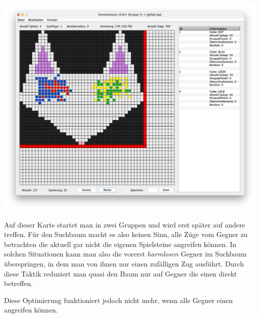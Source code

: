 \vspace{1em}
\begin{minipage}{\linewidth}
    \centering
    \includegraphics[width=0.8\linewidth]{pics/gitlab}
    \label{fig:gitlab}
\end{minipage}
\vspace{1em}

Auf dieser Karte startet man in zwei Gruppen und wird erst sp\"ater auf andere treffen.
F\"ur den Suchbaum macht es also keinen Sinn, alle Z\"uge vom Gegner zu betrachten die aktuell gar nicht die eigenen Spielsteine angreifen k\"onnen.
In solchen Situationen kann man also die vorerst \textit{harmlosen} Gegner im Suchbaum \"uberspringen, in dem man von ihnen nur einen zuf\"alligen Zug ausf\"uhrt.
Durch diese Taktik reduziert man quasi den Baum nur auf Gegner die einen direkt betreffen.

Diese Optimierung funktioniert jedoch nicht mehr, wenn alle Gegner einen angreifen k\"onnen.


\bigskip
\newpage